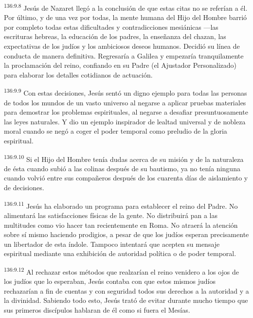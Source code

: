 \par
\textsuperscript{136:9.8} Jesús de Nazaret llegó a la conclusión de que estas citas no se referían a él. Por último, y de una vez por todas, la mente humana del Hijo del Hombre barrió por completo todas estas dificultades y contradicciones mesiánicas ---las escrituras hebreas, la educación de los padres, la enseñanza del chazan, las expectativas de los judíos y los ambiciosos deseos humanos. Decidió su línea de conducta de manera definitiva. Regresaría a Galilea y empezaría tranquilamente la proclamación del reino, confiando en su Padre (el Ajustador Personalizado) para elaborar los detalles cotidianos de actuación.

\par
\textsuperscript{136:9.9} Con estas decisiones, Jesús sentó un digno ejemplo para todas las personas de todos los mundos de un vasto universo al negarse a aplicar pruebas materiales para demostrar los problemas espirituales, al negarse a desafiar presuntuosamente las leyes naturales. Y dio un ejemplo inspirador de lealtad universal y de nobleza moral cuando se negó a coger el poder temporal como preludio de la gloria espiritual.

\par
\textsuperscript{136:9.10} Si el Hijo del Hombre tenía dudas acerca de su misión y de la naturaleza de ésta cuando subió a las colinas después de su bautismo, ya no tenía ninguna cuando volvió entre sus compañeros después de los cuarenta días de aislamiento y de decisiones.

\par
\textsuperscript{136:9.11} Jesús ha elaborado un programa para establecer el reino del Padre. No alimentará las satisfacciones físicas de la gente. No distribuirá pan a las multitudes como vio hacer tan recientemente en Roma. No atraerá la atención sobre sí mismo haciendo prodigios, a pesar de que los judíos esperan precisamente un libertador de esta índole. Tampoco intentará que acepten su mensaje espiritual mediante una exhibición de autoridad política o de poder temporal.

\par
\textsuperscript{136:9.12} Al rechazar estos métodos que realzarían el reino venidero a los ojos de los judíos que lo esperaban, Jesús contaba con que estos mismos judíos rechazarían a fin de cuentas y con seguridad todos sus derechos a la autoridad y a la divinidad. Sabiendo todo esto, Jesús trató de evitar durante mucho tiempo que sus primeros discípulos hablaran de él como si fuera el Mesías.

